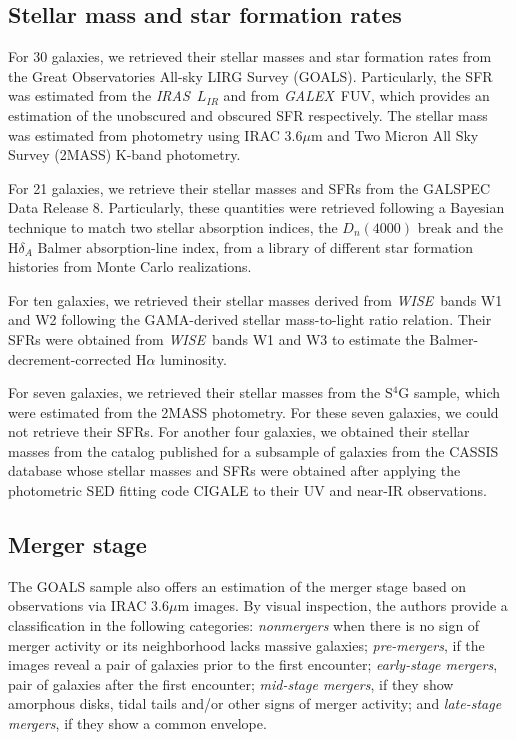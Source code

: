 \documentclass{nature2}
\newcommand{\wise}{{\it WISE}}
\newcommand{\galex}{{\it GALEX}}
\newcommand{\iras}{{\it IRAS}}
\begin{document}
\subsection{Stellar mass and star formation rates}
For 30 galaxies, we retrieved their stellar masses and star formation rates from the Great Observatories All-sky LIRG Survey (GOALS\cite{Armus_2009, Howell_2010}). Particularly, the SFR was estimated from the \iras\ \ensuremath{L_{IR}} and from \galex\ FUV, which provides an estimation of the unobscured and obscured SFR respectively\cite{Howell_2010}. The stellar mass was estimated from photometry using IRAC 3.6\ensuremath{\mu}m and Two Micron All Sky Survey (2MASS) K-band photometry.

For 21 galaxies, we retrieve their stellar masses and SFRs from the {\sc GALSPEC} Data Release 8\cite{Kauffmann_2003, Brinchmann_2004, Tremonti_2004}. Particularly, these quantities were retrieved following a Bayesian technique to match two stellar absorption indices, the \ensuremath{D_{n}(4000)} break\cite{Balogh_1999} and the H\ensuremath{\delta_{A}} Balmer absorption-line index\cite{Worthey_Ottaviani_1997}, from a library of different star formation histories from Monte Carlo realizations\cite{Kauffmann_2003}.

For ten galaxies, we retrieved their stellar masses\cite{Parkash_2018} derived from \wise\ bands W1 and W2 following the GAMA-derived stellar mass-to-light ratio relation\cite{Cluver_2014}. Their SFRs were obtained from \wise\ bands W1 and W3 to estimate the Balmer-decrement-corrected H\ensuremath{\alpha} luminosity\cite{Cluver_2017, Brown_2017, Parkash_2018}.

For seven galaxies, we retrieved their stellar masses from the S\ensuremath{^{4}}G\cite{Sheth_2010, Munoz-Mateos_2013, Querejeta_2015, Munoz-Mateos_2015} sample, which were estimated from the 2MASS photometry\cite{Bell_2003}. For these seven galaxies, we could not retrieve their SFRs. For another four galaxies, we obtained their stellar masses from the catalog published for a subsample of galaxies from the CASSIS database whose stellar masses and SFRs were obtained after applying the photometric SED fitting code {\sc CIGALE}\cite{Ciesla_2015, Boquien_2019} to their UV and near-IR observations\cite{Vika_2017}.

\subsection{Merger stage}
The GOALS sample also offers\cite{Stierwalt_2013} an estimation of the merger stage based on observations via IRAC 3.6\ensuremath{\mu}m images. By visual inspection, the authors provide a classification in the following categories: {\it nonmergers} when there is no sign of merger activity or its neighborhood lacks massive galaxies; {\it pre-mergers}, if the images reveal a pair of galaxies prior to the first encounter; {\it early-stage mergers}, pair of galaxies after the first encounter; {\it mid-stage mergers}, if they show amorphous disks, tidal tails and/or other signs of merger activity; and {\it late-stage mergers}, if they show a common envelope. 
\end{document}
